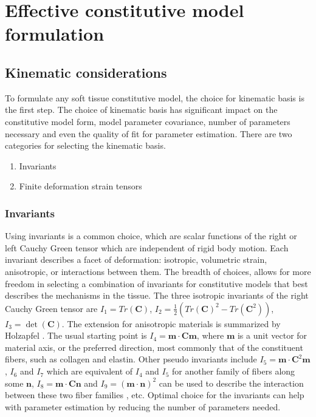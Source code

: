 
\section{Effective constitutive model formulation}

\subsection{Kinematic considerations}
	
	To formulate any soft tissue constitutive model, the choice for kinematic basis is the first step. The choice of kinematic basis has significant impact on the constitutive model form, model parameter covariance, number of parameters necessary and even the quality of fit for parameter estimation. There are two categories for selecting the kinematic basis.
	
\begin{enumerate}
\item Invariants
\item Finite deformation strain tensors
\end{enumerate}

\subsubsection{Invariants} \label{sec:invariants}
	Using invariants is a common choice, which are scalar functions of the right or left Cauchy Green tensor which are independent of rigid body motion. Each invariant describes a facet of deformation: isotropic, volumetric strain, anisotropic, or interactions between them. The breadth of choices, allows for more freedom in selecting a combination of invariants for constitutive models that best describes the mechanisms in the tissue. The three isotropic invariants of the right Cauchy Green tensor are $I_1 = Tr(\mathbf{C})$, $I_2 = \frac{1}{2}\left( Tr(\mathbf{C})^2 - Tr(\mathbf{C}^2)\right)$, $I_3 = \det(\mathbf{C})$. The extension for anisotropic materials is summarized by Holzapfel \cite{holzapfel_nonlinear_2000}. The usual starting point is $I_4 = \mathbf{m}\cdot \mathbf{C} \mathbf{m}$, where $\mathbf{m}$ is a unit vector for material axis, or the preferred direction, most commonly that of the constituent fibers, such as collagen and elastin. Other pseudo invariants include $I_5 = \mathbf{m}\cdot \mathbf{C}^2 \mathbf{m}$, $I_6$ and $I_7$ which are equivalent of $I_4$ and $I_5$ for another family of fibers along some $\mathbf{n}$, $I_8 = \mathbf{m}\cdot\mathbf{C}\mathbf{n}$ and $I_9 = (\mathbf{m}\cdot\mathbf{n})^2$ can be used to describe the interaction between these two fiber families \cite{sacks_novel_2016}\cite{avazmohammadi_novel_2017}, etc. Optimal choice for the invariants can help with parameter estimation by reducing the number of parameters needed. 


